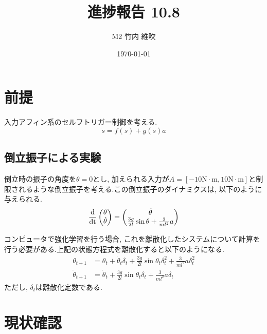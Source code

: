 \documentclass{jsarticle}
\title{\large{\bf{進捗報告 10.8}}}
\author{M2 竹内 維吹}
\date{\today}
\newcommand{\odif}[2]{\frac{\rm{d}#1}{\rm{d}#2}}
\begin{document}
\maketitle


\section{前提}
入力アフィン系のセルフトリガー制御を考える. 
\begin{equation}
	\dot{s} = f(s) + g(s)a \label{continuous}
\end{equation}

\subsection{倒立振子による実験}
倒立時の振子の角度を$\theta=0$とし, 加えられる入力が$A=[-10\textrm{N}\cdot\textrm{m},10\textrm{N}\cdot\textrm{m}]$と制限されるような倒立振子を考える.この倒立振子のダイナミクスは, 以下のように与えられる.
\begin{equation}
	\odif{}{t}\begin{pmatrix}\theta \\ \dot{\theta}\end{pmatrix} = 
		\begin{pmatrix}\dot{\theta} \\ \frac{3g}{2l}\sin{\theta} + \frac{3}{ml^2}a \end{pmatrix} \label{pendulum}
\end{equation}

コンピュータで強化学習を行う場合, これを離散化したシステムについて計算を行う必要がある.上記の状態方程式を離散化すると以下のようになる.
\begin{align}
	\theta_{t+1} &= \theta_t+\dot{\theta}_t\delta_t+\frac{3g}{2l}\sin{\theta_t}\delta_t^2+\frac{3}{ml^2}a\delta_t^2 \tag{3a}\\
	\dot{\theta}_{t+1} &=  \dot{\theta}_t+\frac{3g}{2l}\sin{\theta_t}\delta_t+\frac{3}{ml^2}a\delta_t \tag{3b}
\end{align}\label{pend}
\setcounter{equation}{3}
ただし, $\delta_t$は離散化定数である.\par


\section{現状確認}
\end{document}

